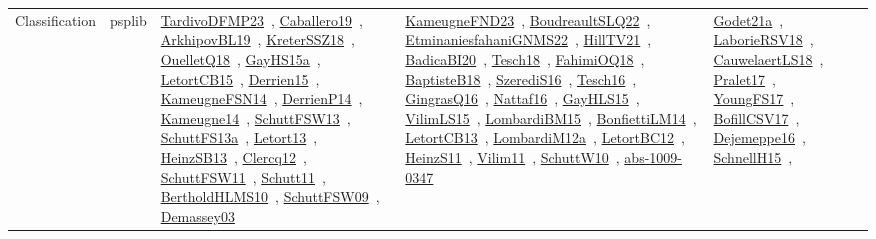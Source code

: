 {\begin{longtable}{lp{3cm}>{\raggedright\arraybackslash}p{6cm}>{\raggedright\arraybackslash}p{6cm}>{\raggedright\arraybackslash}p{8cm}}
Classification & psplib & \href{works/TardivoDFMP23.pdf}{TardivoDFMP23}~\cite{TardivoDFMP23}, \href{works/Caballero19.pdf}{Caballero19}~\cite{Caballero19}, \href{works/ArkhipovBL19.pdf}{ArkhipovBL19}~\cite{ArkhipovBL19}, \href{works/KreterSSZ18.pdf}{KreterSSZ18}~\cite{KreterSSZ18}, \href{works/OuelletQ18.pdf}{OuelletQ18}~\cite{OuelletQ18}, \href{works/GayHS15a.pdf}{GayHS15a}~\cite{GayHS15a}, \href{works/LetortCB15.pdf}{LetortCB15}~\cite{LetortCB15}, \href{works/Derrien15.pdf}{Derrien15}~\cite{Derrien15}, \href{works/KameugneFSN14.pdf}{KameugneFSN14}~\cite{KameugneFSN14}, \href{works/DerrienP14.pdf}{DerrienP14}~\cite{DerrienP14}, \href{works/Kameugne14.pdf}{Kameugne14}~\cite{Kameugne14}, \href{works/SchuttFSW13.pdf}{SchuttFSW13}~\cite{SchuttFSW13}, \href{works/SchuttFS13a.pdf}{SchuttFS13a}~\cite{SchuttFS13a}, \href{works/Letort13.pdf}{Letort13}~\cite{Letort13}, \href{works/HeinzSB13.pdf}{HeinzSB13}~\cite{HeinzSB13}, \href{works/Clercq12.pdf}{Clercq12}~\cite{Clercq12}, \href{works/SchuttFSW11.pdf}{SchuttFSW11}~\cite{SchuttFSW11}, \href{works/Schutt11.pdf}{Schutt11}~\cite{Schutt11}, \href{works/BertholdHLMS10.pdf}{BertholdHLMS10}~\cite{BertholdHLMS10}, \href{works/SchuttFSW09.pdf}{SchuttFSW09}~\cite{SchuttFSW09}, \href{works/Demassey03.pdf}{Demassey03}~\cite{Demassey03} & \href{works/KameugneFND23.pdf}{KameugneFND23}~\cite{KameugneFND23}, \href{works/BoudreaultSLQ22.pdf}{BoudreaultSLQ22}~\cite{BoudreaultSLQ22}, \href{works/EtminaniesfahaniGNMS22.pdf}{EtminaniesfahaniGNMS22}~\cite{EtminaniesfahaniGNMS22}, \href{works/HillTV21.pdf}{HillTV21}~\cite{HillTV21}, \href{works/BadicaBI20.pdf}{BadicaBI20}~\cite{BadicaBI20}, \href{works/Tesch18.pdf}{Tesch18}~\cite{Tesch18}, \href{works/FahimiOQ18.pdf}{FahimiOQ18}~\cite{FahimiOQ18}, \href{works/BaptisteB18.pdf}{BaptisteB18}~\cite{BaptisteB18}, \href{works/SzerediS16.pdf}{SzerediS16}~\cite{SzerediS16}, \href{works/Tesch16.pdf}{Tesch16}~\cite{Tesch16}, \href{works/GingrasQ16.pdf}{GingrasQ16}~\cite{GingrasQ16}, \href{works/Nattaf16.pdf}{Nattaf16}~\cite{Nattaf16}, \href{works/GayHLS15.pdf}{GayHLS15}~\cite{GayHLS15}, \href{works/VilimLS15.pdf}{VilimLS15}~\cite{VilimLS15}, \href{works/LombardiBM15.pdf}{LombardiBM15}~\cite{LombardiBM15}, \href{works/BonfiettiLM14.pdf}{BonfiettiLM14}~\cite{BonfiettiLM14}, \href{works/LetortCB13.pdf}{LetortCB13}~\cite{LetortCB13}, \href{works/LombardiM12a.pdf}{LombardiM12a}~\cite{LombardiM12a}, \href{works/LetortBC12.pdf}{LetortBC12}~\cite{LetortBC12}, \href{works/HeinzS11.pdf}{HeinzS11}~\cite{HeinzS11}, \href{works/Vilim11.pdf}{Vilim11}~\cite{Vilim11}, \href{works/SchuttW10.pdf}{SchuttW10}~\cite{SchuttW10}, \href{works/abs-1009-0347.pdf}{abs-1009-0347}~\cite{abs-1009-0347} & \href{works/Godet21a.pdf}{Godet21a}~\cite{Godet21a}, \href{works/LaborieRSV18.pdf}{LaborieRSV18}~\cite{LaborieRSV18}, \href{works/CauwelaertLS18.pdf}{CauwelaertLS18}~\cite{CauwelaertLS18}, \href{works/Pralet17.pdf}{Pralet17}~\cite{Pralet17}, \href{works/YoungFS17.pdf}{YoungFS17}~\cite{YoungFS17}, \href{works/BofillCSV17.pdf}{BofillCSV17}~\cite{BofillCSV17}, \href{works/Dejemeppe16.pdf}{Dejemeppe16}~\cite{Dejemeppe16}, \href{works/SchnellH15.pdf}{SchnellH15}~\cite{SchnellH15}, 
\end{longtable}}
